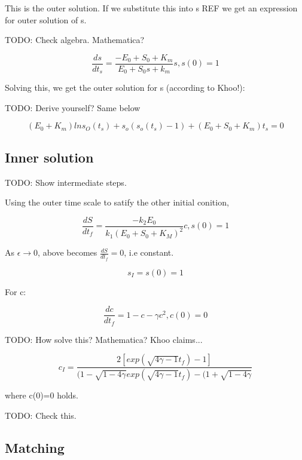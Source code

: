 \documentclass[12pt]{article}
\begin{document}
This is the outer solution. If we substitute this into s REF we get an
expression for outer solution of s.

TODO: Check algebra. Mathematica?

\begin{equation}
\frac{ds}{dt_s} = \frac{-E_0 + S_0 + K_m}{E_0 + S_0s + k_m}s, s(0) = 1
\end{equation}

Solving this, we get the outer solution for s (according to Khoo!):

TODO: Derive yourself? Same below

\begin{equation}
(E_0 + K_m) ln s_O(t_s) + s_o(s_o(t_s) - 1) + (E_0 + S_0 + K_m) t_s = 0
\end{equation}

\subsection{Inner solution}

TODO: Show intermediate steps.

Using the outer time scale to satify the other initial conition,

\begin{equation}
\frac{dS}{dt_f} = \frac{-k_2 E_0}{k_1(E_0 + S_0 + K_M)^2} c, s(0) = 1
\end{equation}

As $\epsilon \to 0$, above becomes $\frac{dS}{dt_f} = 0$, i.e constant.

\begin{equation}
s_I = s(0) = 1
\end{equation}

For c:

\begin{equation}
\frac{dc}{dt_f} = 1 - c - \gamma c^2, c(0)=0
\end{equation}

TODO: How solve this? Mathematica? Khoo claims...

\begin{equation}
c_I = \frac{2[exp(\sqrt{4\gamma-1}t_f)-1]}{(1-\sqrt{1-4\gamma}
exp(\sqrt{4\gamma-1}t_f) - (1+\sqrt{1-4\gamma}}
\end{equation}

where c(0)=0 holds.

TODO: Check this.

\subsection{Matching}
\end{document}
